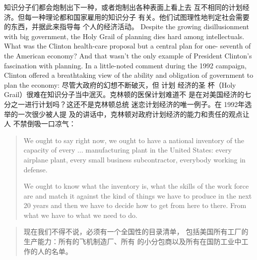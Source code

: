 \begin{paracol}{2}
知识分子们都会炮制出下一种，或者炮制出各种表面上看上去
互不相同的计划经济。但每一种理论都和国家雇用的知识分子
有关。他们试图理性地判定社会需要的东西，并据此来指导每
个人的经济活动。
\switchcolumn*
Despite the growing disillusionment with big government,
the Holy Grail of planning dies hard among intellectuals. What
was the Clinton health-care proposal but a central plan for one-
seventh of the American economy? And that wasn't the only
example of President Clinton's fascination with planning. In a
little-noted comment during the 1992 campaign, Clinton offered a breathtaking view of the ability and obligation of government to plan the economy:
\switchcolumn
尽管大政府的幻想不断破灭，但 计划 经济的圣 杯（Holy Grail）很难在知识分子当中泯灭。克林顿的医保计划难道不
是在对美国经济的七分之一进行计划吗？这还不是克林顿总统
迷恋计划经济的唯一例子。在 1992年选举的一次很少被人提
及的讲话中，克林顿对政府计划经济的能力和责任的观点让人
不禁倒吸一口凉气：
\switchcolumn*
\begin{quotation}
We ought to say right now, we ought to have a national inventory of the capacity of every $\ldots$ manufacturing plant in the
United States: every airplane plant, every small business subcontractor, everybody working in defense.

We ought to know what the inventory is, what the skills of the
work force are and match it against the kind of things we have to produce in the next 20 years and then we have to decide how to
get from here to there. From what we have to what we need to do.
\end{quotation}
\switchcolumn
\begin{quotation}
现在我们不得不说，必须有一个全国性的目录清单，
包括美国所有工厂的生产能力：所有的飞机制造厂、所有
的小分包商以及所有在国防工业中工作的人的名单。


\end{quotation}
\end{paracol}
